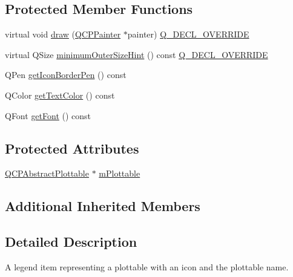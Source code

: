 \subsection*{Protected Member Functions}
\begin{DoxyCompactItemize}
\item 
virtual void \mbox{\hyperlink{class_q_c_p_plottable_legend_item_a5838366619200e99680afa6d355d13fa}{draw}} (\mbox{\hyperlink{class_q_c_p_painter}{Q\+C\+P\+Painter}} $\ast$painter) \mbox{\hyperlink{qcustomplot_8h_a42cc5eaeb25b85f8b52d2a4b94c56f55}{Q\+\_\+\+D\+E\+C\+L\+\_\+\+O\+V\+E\+R\+R\+I\+DE}}
\item 
virtual Q\+Size \mbox{\hyperlink{class_q_c_p_plottable_legend_item_a8b543f3ac32b2fe59326e01c1101b3b8}{minimum\+Outer\+Size\+Hint}} () const \mbox{\hyperlink{qcustomplot_8h_a42cc5eaeb25b85f8b52d2a4b94c56f55}{Q\+\_\+\+D\+E\+C\+L\+\_\+\+O\+V\+E\+R\+R\+I\+DE}}
\item 
Q\+Pen \mbox{\hyperlink{class_q_c_p_plottable_legend_item_afa81a8bd4434ec249efbbfc2a030a752}{get\+Icon\+Border\+Pen}} () const
\item 
Q\+Color \mbox{\hyperlink{class_q_c_p_plottable_legend_item_a55daaffee35326765deebf8271efe210}{get\+Text\+Color}} () const
\item 
Q\+Font \mbox{\hyperlink{class_q_c_p_plottable_legend_item_a77d980f594046226f9ac075fa07244b3}{get\+Font}} () const
\end{DoxyCompactItemize}
\subsection*{Protected Attributes}
\begin{DoxyCompactItemize}
\item 
\mbox{\hyperlink{class_q_c_p_abstract_plottable}{Q\+C\+P\+Abstract\+Plottable}} $\ast$ \mbox{\hyperlink{class_q_c_p_plottable_legend_item_ada647fb4b22971a1a424e15b4f6af0d9}{m\+Plottable}}
\end{DoxyCompactItemize}
\subsection*{Additional Inherited Members}


\subsection{Detailed Description}
A legend item representing a plottable with an icon and the plottable name. 

